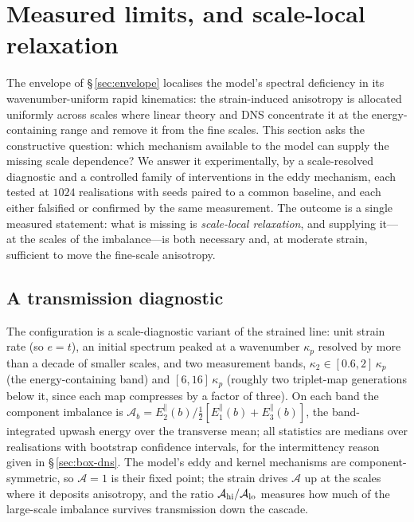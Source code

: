 \documentclass[11pt,a4paper]{article}
\begin{document}
\section{Measured limits, and scale-local relaxation}\label{sec:limits}

The envelope of \S\,\ref{sec:envelope} localises the model's spectral
deficiency in its wavenumber-uniform rapid kinematics: the strain-induced
anisotropy is allocated uniformly across scales where linear theory and
DNS concentrate it at the energy-containing range and remove it from the
fine scales. This section asks the constructive question: which mechanism
available to the model can supply the missing scale dependence? We answer
it experimentally, by a scale-resolved diagnostic and a controlled family
of interventions in the eddy mechanism, each tested at $1024$
realisations with seeds paired to a common baseline, and each either
falsified or confirmed by the same measurement. The outcome is a single
measured statement: what is missing is \emph{scale-local relaxation}, and
supplying it---at the scales of the imbalance---is both necessary and, at
moderate strain, sufficient to move the fine-scale anisotropy.

\subsection{A transmission diagnostic}\label{sec:transmission}

The configuration is a scale-diagnostic variant of the strained line: unit
strain rate (so $e=t$), an initial spectrum peaked at a wavenumber
$\kappa_p$ resolved by more than a decade of smaller scales, and two
measurement bands, $\kappa_2\in[0.6,2]\,\kappa_p$ (the energy-containing
band) and $[6,16]\,\kappa_p$ (roughly two triplet-map generations below
it, since each map compresses by a factor of three). On each band the
component imbalance is
$\mathcal A_b = E^{\|}_2(b)/\tfrac12[E^{\|}_1(b)+E^{\|}_3(b)]$, the
band-integrated upwash energy over the transverse mean; all statistics are
medians over realisations with bootstrap confidence intervals, for the
intermittency reason given in \S\,\ref{sec:box-dns}. The model's eddy and
kernel mechanisms are component-symmetric, so $\mathcal A=1$ is their
fixed point; the strain drives $\mathcal A$ up at the scales where it
deposits anisotropy, and the ratio
$\mathcal A_{\rm hi}/\mathcal A_{\rm lo}$ measures how much of the
large-scale imbalance survives transmission down the cascade.
\end{document}
